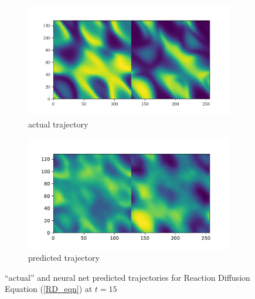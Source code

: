 \documentclass[10pt]{article}
\begin{document}
\begin{figure}[b!]\centering
\begin{subfigure}{.45\textwidth}\centering
    \includegraphics[width=\textwidth]{img/prediction_t15.pdf}
    \caption{actual trajectory}
    \label{sample_RD_trajectory}
\end{subfigure}\hfill
\begin{subfigure}{.45\textwidth}\centering
    \includegraphics[width=\textwidth]{img/svd_prediction_t15.pdf}
    \caption{predicted trajectory}
    \label{predicted_RD_trajectory}
\end{subfigure}
\caption{``actual'' and neural net predicted trajectories for Reaction Diffusion Equation (\ref{RD_eqn}) at \( t=15 \)}
\label{RD_trajectory}
\end{figure}
\end{document}
